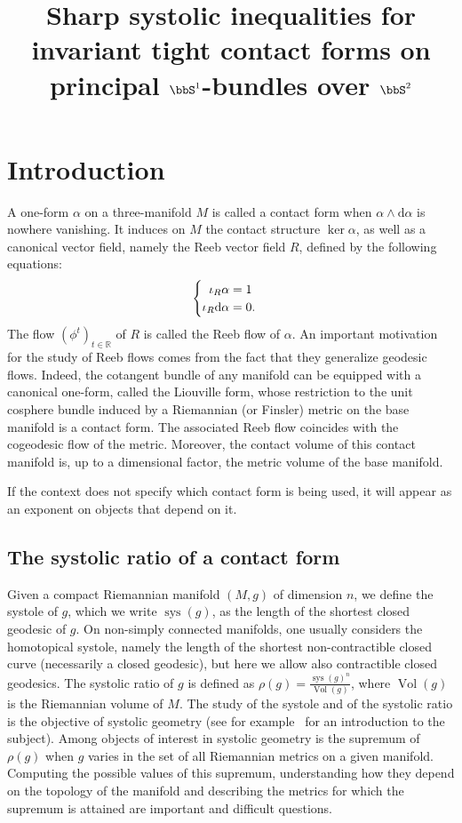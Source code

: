 \documentclass[AHL,Unicode,longabstracts]{cedram}
\title[Systolic inequalities for tight \texorpdfstring{$\bbS^1$}{S1}-invariant contact forms]{Sharp systolic inequalities for invariant tight contact forms on principal \texorpdfstring{$\bbS^1$}{S1}-bundles over \texorpdfstring{$\bbS^2$}{S2}}
\author[\initial{S.} \lastname{Vialaret}]{\firstname{Simon} \lastname{Vialaret}}
\makeatletter
\DeclareMathOperator{\vol}{Vol}
\DeclareMathOperator{\sys}{sys}
\newcommand{\bbR}{\mathbb{R}}
\newcommand{\rmd}{\mathrm{d}}
\newenvironment{alcases}{\left\{\begingroup\arraycolsep=0pt\renewcommand{\arraystretch}{1.2}\begin{array}{r@{\;}l@{\quad}l}}{\end{array}\endgroup\right.}
\makeatother
\begin{document}
\maketitle

\section{Introduction}

A one-form $\alpha$ on a three-manifold $M$ is called a contact form when $\alpha \wedge \rmd  \alpha$ is nowhere vanishing. It induces on $M$ the contact structure $\ker \alpha$, as well as a canonical vector field, namely the Reeb vector field $R$, defined by the following equations:
\begin{equation*}
\begin{alcases}
\iota_R \alpha &= 1\\
\iota_R \rmd \alpha &= 0.
\end{alcases}
\end{equation*}
The flow $(\phi^t)_{t\in \bbR}$ of $R$ is called the Reeb flow of $\alpha$. An important motivation for the study of Reeb flows comes from the fact that they generalize geodesic flows. Indeed, the cotangent bundle of any manifold can be equipped with a canonical one-form, called the Liouville form, whose restriction to the unit cosphere bundle induced by a Riemannian (or Finsler) metric on the base manifold is a contact form. The associated Reeb flow coincides with the cogeodesic flow of the metric. Moreover, the contact volume of this contact manifold is, up to a dimensional factor, the metric volume of the base manifold.

\begin{rema}
If the context does not specify which contact form is being used, it will appear as an exponent on objects that depend on it.
\end{rema}

\subsection{The systolic ratio of a contact form}\label{par:systolic_ratio_of_a_contact_form}

Given a compact Riemannian manifold $(M,g)$ of dimension $n$, we define the systole of $g$, which we write $\sys(g)$, as the length of the shortest closed geodesic of $g$. On non-simply connected manifolds, one usually considers the homotopical systole, namely the length of the shortest non-contractible closed curve (necessarily a closed geodesic), but here we allow also contractible closed geodesics. The systolic ratio of $g$ is defined as $\rho(g) = \frac{\sys(g)^n}{\vol(g)}$, where $\vol(g)$ is the Riemannian volume of $M$. The study of the systole and of the systolic ratio is the objective of systolic geometry (see for example~\cite{benedetti2021steps,Katz_2007} for an introduction to the subject). Among objects of interest in systolic geometry is the supremum of $\rho(g)$ when $g$ varies in the set of all Riemannian metrics on a given manifold. Computing the possible values of this supremum, understanding how they depend on the topology of the manifold and describing the metrics for which the supremum is attained are important and difficult questions.
\end{document}

